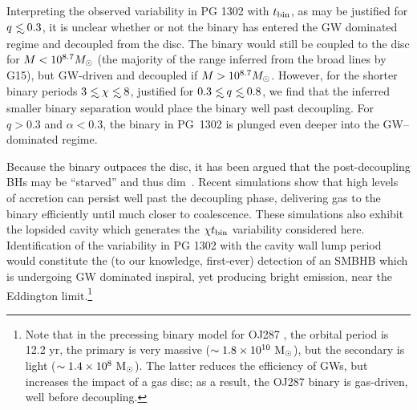 Interpreting the observed variability in PG 1302 with $t_{\rm bin}$, as
may be justified for $q\lsim 0.3$, it is unclear whether or not the
binary has entered the GW dominated regime and decoupled from the
disc. The binary would still be coupled to the disc for 
$M<10^{8.7} {{M_{\odot}}}$ (the majority of the range inferred from the broad lines by G15), but GW-driven and decoupled if
$M>10^{8.7} {{M_{\odot}}}$. However, for the shorter binary periods $3 \lsim
\chi\lsim8$, justified for $0.3 \lsim q \lsim 0.8$, we find
that the inferred smaller binary separation would place the binary
well past decoupling.  For $q>0.3$ and $\alpha<0.3$, the binary in
PG~1302 is plunged even deeper into the GW--dominated regime.




Because the binary outpaces the disc, it has
been argued that the post-decoupling BHs may be ``starved'' and thus
dim~\citep{Milos:Phinney:2005,Shapiro:2010,TM10}. Recent simulations
\citep{Noble+2012, Farris:2015:GW} show that high levels of accretion
can persist well past the decoupling phase, delivering gas to the
binary efficiently until much closer to coalescence. These simulations
also exhibit the lopsided cavity which generates the $\chi t_{\rm{bin}}$
variability considered here. Identification of the variability in PG
1302 with the cavity wall lump period would constitute the (to our
knowledge, first-ever) detection of an SMBHB which is undergoing GW
dominated inspiral, yet producing bright emission, near the Eddington
limit.\vspace{-1\baselineskip}\footnote{Note that in the precessing
  binary model for OJ287 \citep{LehtoValtonen1996,Valtonen+2008}, the
  orbital period is 12.2 yr, the primary is very massive ($\sim
  1.8\times10^{10}~{\rm M_\odot}$), but the secondary is light ($\sim
  1.4\times10^{8}~{\rm M_\odot}$). The latter reduces the efficiency
  of GWs, but increases the impact of a gas disc; as a result, the
  OJ287 binary is gas-driven, well before decoupling.}



 



